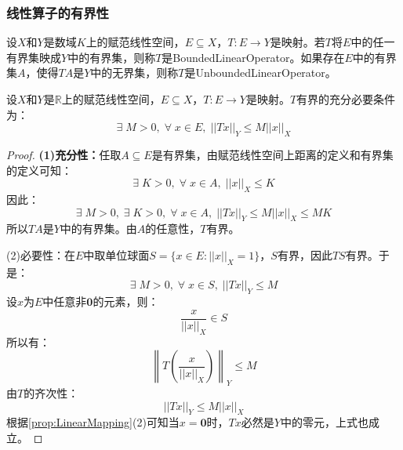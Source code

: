 \subsubsection{线性算子的有界性}
\begin{definition}
	设$X$和$Y$是数域$K$上的赋范线性空间，$E\subseteq X$，$T:E\to Y$是映射。若$T$将$E$中的任一有界集映成$Y$中的有界集，则称$T$是\gls{BoundedLinearOperator}。如果存在$E$中的有界集$A$，使得$TA$是$Y$中的无界集，则称$T$是\gls{UnboundedLinearOperator}。
\end{definition}
\begin{property}\label{prop:BoundedLinearOperator}
	设$X$和$Y$是$\mathbb{R}$上的赋范线性空间，$E\subseteq X$，$T:E\to Y$是映射。$T$有界的充分必要条件为：
	\begin{equation*}
		\exists\;M>0,\;\forall\;x\in E,\;||Tx||_Y\leqslant M||x||_X
	\end{equation*}
\end{property}
\begin{proof}
	\textbf{(1)充分性：}任取$A\subseteq E$是有界集，由赋范线性空间上距离的定义和有界集的定义可知：
	\begin{equation*}
		\exists\;K>0,\;\forall\;x\in A,\;||x||_X\leqslant K
	\end{equation*}
	因此：
	\begin{equation*}
		\exists\;M>0,\;\exists\;K>0,\;\forall\;x\in A,\;||Tx||_Y\leqslant M||x||_X\leqslant MK
	\end{equation*}
	所以$TA$是$Y$中的有界集。由$A$的任意性，$T$有界。\par
	(2)必要性：在$E$中取单位球面$S=\{x\in E:||x||_X=1\}$，$S$有界，因此$TS$有界。于是：
	\begin{equation*}
		\exists\;M>0,\;\forall\;x\in S,\;||Tx||_Y\leqslant M
	\end{equation*}
	设$x$为$E$中任意非$\mathbf{0}$的元素，则：
	\begin{equation*}
		\frac{x}{||x||_X}\in S
	\end{equation*}
	所以有：
	\begin{equation*}
		\left\|T\left(\frac{x}{||x||_X}\right)\right\|_Y\leqslant M
	\end{equation*}
	由$T$的齐次性：
	\begin{equation*}
		||Tx||_Y\leqslant M||x||_X
	\end{equation*}
	根据\cref{prop:LinearMapping}(2)可知当$x=\mathbf{0}$时，$Tx$必然是$Y$中的零元，上式也成立。
\end{proof}
